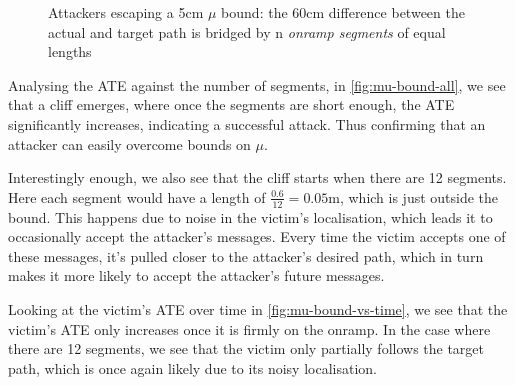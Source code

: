 \begin{figure}[!h]
	\centering
	\caption{Attackers escaping a 5cm $\mu$ bound: the 60cm difference between the actual and target path is bridged by n \textit{onramp segments} of equal lengths}
\end{figure}


Analysing the ATE against the number of segments, in \autoref{fig:mu-bound-all}, we see that a cliff emerges, where once the segments are short enough, the ATE significantly increases, indicating a successful attack. Thus confirming that an attacker can easily overcome bounds on $\mu$.

Interestingly enough, we also see that the cliff starts when there are 12 segments. Here each segment would have a length of $\frac{0.6}{12} = 0.05$m, which is just outside the bound. This happens due to noise in the victim's localisation, which leads it to occasionally accept the attacker's messages. Every time the victim accepts one of these messages, it's pulled closer to the attacker's desired path, which in turn makes it more likely to accept the attacker's future messages.

Looking at the victim's ATE over time in \autoref{fig:mu-bound-vs-time}, we see that the victim's ATE only increases once it is firmly on the onramp. In the case where there are 12 segments, we see that the victim only partially follows the target path, which is once again likely due to its noisy localisation. 

